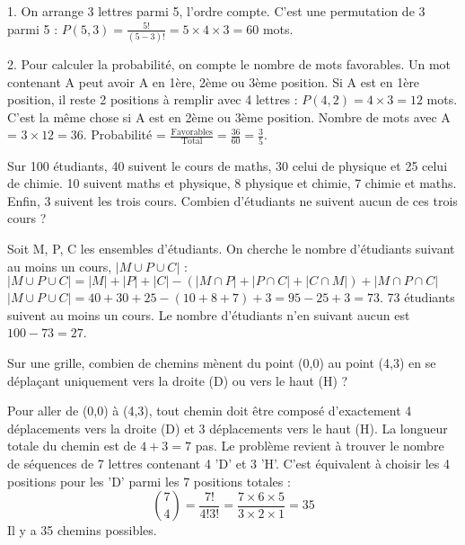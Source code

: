 \begin{correctionbox}
1. On arrange 3 lettres parmi 5, l'ordre compte. C'est une permutation de 3 parmi 5 :
$P(5, 3) = \frac{5!}{(5-3)!} = 5 \times 4 \times 3 = 60$ mots.

2. Pour calculer la probabilité, on compte le nombre de mots favorables.
Un mot contenant A peut avoir A en 1ère, 2ème ou 3ème position.
Si A est en 1ère position, il reste 2 positions à remplir avec 4 lettres : $P(4, 2) = 4 \times 3 = 12$ mots.
C'est la même chose si A est en 2ème ou 3ème position.
Nombre de mots avec A = $3 \times 12 = 36$.
Probabilité = $\frac{\text{Favorables}}{\text{Total}} = \frac{36}{60} = \frac{3}{5}$.
\end{correctionbox}

\begin{exercicebox}
Sur 100 étudiants, 40 suivent le cours de maths, 30 celui de physique et 25 celui de chimie. 10 suivent maths et physique, 8 physique et chimie, 7 chimie et maths. Enfin, 3 suivent les trois cours. Combien d'étudiants ne suivent aucun de ces trois cours ?
\end{exercicebox}

\begin{correctionbox}
Soit M, P, C les ensembles d'étudiants. On cherche le nombre d'étudiants suivant au moins un cours, $|M \cup P \cup C|$ :
$|M \cup P \cup C| = |M| + |P| + |C| - (|M \cap P| + |P \cap C| + |C \cap M|) + |M \cap P \cap C|$
$|M \cup P \cup C| = 40 + 30 + 25 - (10 + 8 + 7) + 3 = 95 - 25 + 3 = 73$.
73 étudiants suivent au moins un cours.
Le nombre d'étudiants n'en suivant aucun est $100 - 73 = 27$.
\end{correctionbox}

\begin{exercicebox}
Sur une grille, combien de chemins mènent du point (0,0) au point (4,3) en se déplaçant uniquement vers la droite (D) ou vers le haut (H) ?
\end{exercicebox}

\begin{correctionbox}
Pour aller de (0,0) à (4,3), tout chemin doit être composé d'exactement 4 déplacements vers la droite (D) et 3 déplacements vers le haut (H). La longueur totale du chemin est de $4+3=7$ pas.
Le problème revient à trouver le nombre de séquences de 7 lettres contenant 4 'D' et 3 'H'.
C'est équivalent à choisir les 4 positions pour les 'D' parmi les 7 positions totales :
$$ \binom{7}{4} = \frac{7!}{4!3!} = \frac{7 \times 6 \times 5}{3 \times 2 \times 1} = 35 $$
Il y a 35 chemins possibles.
\end{correctionbox}

